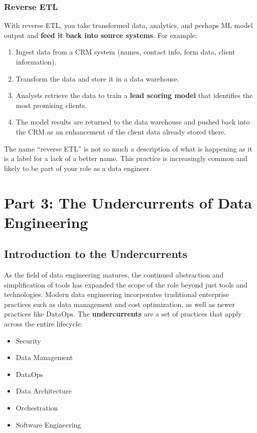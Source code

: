\documentclass{article}
\begin{document}
\subsubsection{Reverse ETL}
With reverse ETL, you take transformed data, analytics, and perhaps ML model output and \textbf{feed it back into source systems}. For example:
\begin{enumerate}
    \item Ingest data from a CRM system (names, contact info, form data, client information).
    \item Transform the data and store it in a data warehouse.
    \item Analysts retrieve the data to train a \textbf{lead scoring model} that identifies the most promising clients.
    \item The model results are returned to the data warehouse and pushed back into the CRM as an enhancement of the client data already stored there.
\end{enumerate}
The name ``reverse ETL'' is not so much a description of what is happening as it is a label for a lack of a better name. This practice is increasingly common and likely to be part of your role as a data engineer.

\newpage

\section{Part 3: The Undercurrents of Data Engineering}

\subsection{Introduction to the Undercurrents}
As the field of data engineering matures, the continued abstraction and simplification of tools has expanded the scope of the role beyond just tools and technologies. Modern data engineering incorporates traditional enterprise practices such as data management and cost optimization, as well as newer practices like DataOps. The \textbf{undercurrents} are a set of practices that apply across the entire lifecycle:
\begin{itemize}
    \item Security
    \item Data Management
    \item DataOps
    \item Data Architecture
    \item Orchestration
    \item Software Engineering
\end{itemize}
\end{document}
